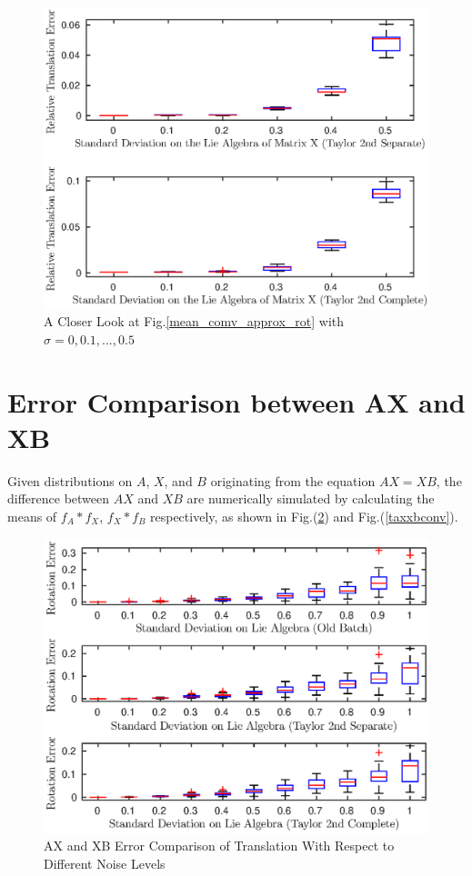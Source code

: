 \documentclass[twocolumn,10pt]{asme2ej}
\begin{document}
\begin{figure}[h]\label{mean_conv_approx_rot_close}
\includegraphics[scale = 0.60]{Mean_Definition_Figures/mean_conv_trans_rel_5.eps}
\caption{A Closer Look at Fig.\ref{mean_comv_approx_rot} with $\sigma = 0, 0.1, ... , 0.5$}
\centering
\end{figure}

\section{Error Comparison between AX and XB}
Given distributions on $A$, $X$, and $B$ originating from the equation $AX=XB$, the difference between $AX$ and $XB$ are numerically simulated by calculating the means of $f_A * f_X$, $f_X * f_B$ respectively, as shown in Fig.(\ref{rotaxxbconv}) and Fig.(\ref{taxxbconv}). 
\begin{figure}[h]
\includegraphics[scale=0.6]{ax_xb_mean_rot_error_1_10.eps}
\caption{AX and XB Error Comparison of Translation With Respect to Different Noise Levels}
\centering
\label{rotaxxbconv}
\end{figure}
\end{document}
